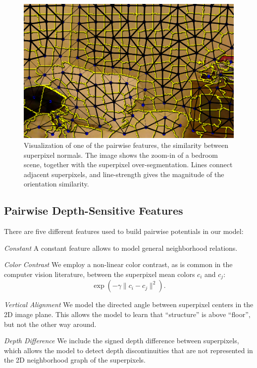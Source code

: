 \documentclass[a4paper, 10pt, conference]{ieeeconf}      %
\begin{document}
\begin{figure}
    \begin{center}
        \includegraphics[width=\linewidth]{images/normal_feature}
    \end{center}
    \caption{%
        Visualization of one of the pairwise features, the similarity between superpixel normals.
        The image shows the zoom-in of a bedroom scene, together with the superpixel over-segmentation.
        Lines connect adjacent superpixels, and line-strength gives the magnitude of the orientation similarity.
    }
\end{figure}

\subsection{Pairwise Depth-Sensitive Features}
There are five different features used to build pairwise potentials in our model:

\emph{Constant}
    A constant feature allows to model general neighborhood relations.


\emph{Color Contrast}
    We employ a non-linear color contrast, as is common in the computer
    vision literature, between the superpixel mean colors $c_i$ and $c_j$:
    \[\exp\left(-\gamma \lVert c_i - c_j \rVert^2\right).\]


\emph{Vertical Alignment}
    We model the directed angle between superpixel centers in the 2D image
    plane.  This allows the  model to learn that ``structure'' is above
    ``floor'', but not the other way around.


\emph{Depth Difference}
    We include the signed depth difference between superpixels, which
    allows the model to detect depth discontinuities that are not
    represented in the 2D neighborhood graph of the superpixels.
\end{document}
